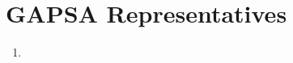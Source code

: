 \chapter{GAPSA Representatives}
\label{art:gapsa-reps}

\begin{enumerate}[label=\Alph*.]
\item 
\end{enumerate}
